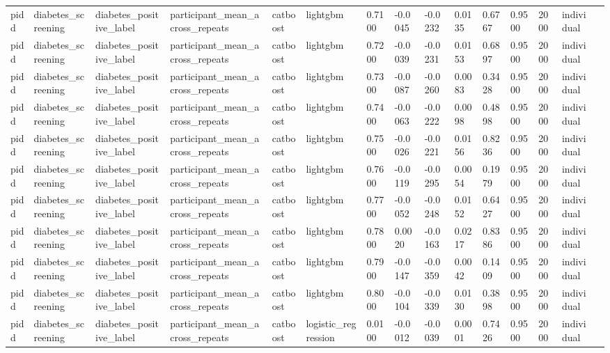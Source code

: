 \begin{tabular}{lllllllllllllll}
pidd & diabetes\_screening & diabetes\_positive\_label & participant\_mean\_across\_repeats & catboost & lightgbm & 0.7100 & -0.0045 & -0.0232 & 0.0135 & 0.6767 & 0.9500 & 2000 & individual &  \\
pidd & diabetes\_screening & diabetes\_positive\_label & participant\_mean\_across\_repeats & catboost & lightgbm & 0.7200 & -0.0039 & -0.0231 & 0.0153 & 0.6897 & 0.9500 & 2000 & individual &  \\
pidd & diabetes\_screening & diabetes\_positive\_label & participant\_mean\_across\_repeats & catboost & lightgbm & 0.7300 & -0.0087 & -0.0260 & 0.0083 & 0.3428 & 0.9500 & 2000 & individual &  \\
pidd & diabetes\_screening & diabetes\_positive\_label & participant\_mean\_across\_repeats & catboost & lightgbm & 0.7400 & -0.0063 & -0.0222 & 0.0098 & 0.4898 & 0.9500 & 2000 & individual &  \\
pidd & diabetes\_screening & diabetes\_positive\_label & participant\_mean\_across\_repeats & catboost & lightgbm & 0.7500 & -0.0026 & -0.0221 & 0.0156 & 0.8236 & 0.9500 & 2000 & individual &  \\
pidd & diabetes\_screening & diabetes\_positive\_label & participant\_mean\_across\_repeats & catboost & lightgbm & 0.7600 & -0.0119 & -0.0295 & 0.0054 & 0.1979 & 0.9500 & 2000 & individual &  \\
pidd & diabetes\_screening & diabetes\_positive\_label & participant\_mean\_across\_repeats & catboost & lightgbm & 0.7700 & -0.0052 & -0.0248 & 0.0152 & 0.6427 & 0.9500 & 2000 & individual &  \\
pidd & diabetes\_screening & diabetes\_positive\_label & participant\_mean\_across\_repeats & catboost & lightgbm & 0.7800 & 0.0020 & -0.0163 & 0.0217 & 0.8386 & 0.9500 & 2000 & individual &  \\
pidd & diabetes\_screening & diabetes\_positive\_label & participant\_mean\_across\_repeats & catboost & lightgbm & 0.7900 & -0.0147 & -0.0359 & 0.0042 & 0.1409 & 0.9500 & 2000 & individual &  \\
pidd & diabetes\_screening & diabetes\_positive\_label & participant\_mean\_across\_repeats & catboost & lightgbm & 0.8000 & -0.0104 & -0.0339 & 0.0130 & 0.3898 & 0.9500 & 2000 & individual &  \\
pidd & diabetes\_screening & diabetes\_positive\_label & participant\_mean\_across\_repeats & catboost & logistic\_regression & 0.0100 & -0.0012 & -0.0039 & 0.0001 & 0.7426 & 0.9500 & 2000 & individual &  \\

\end{tabular}
